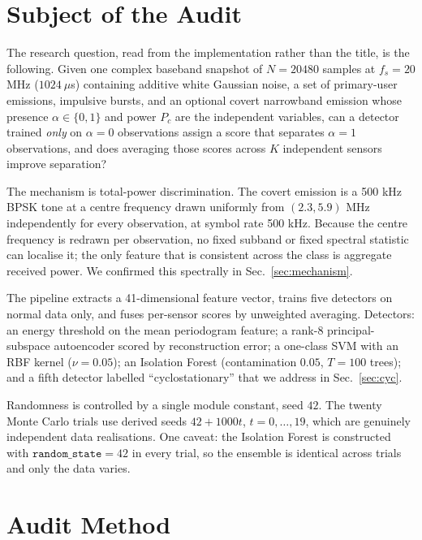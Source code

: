 \documentclass[conference]{IEEEtran}
\begin{document}
\section{Subject of the Audit}
\label{sec:subject}

The research question, read from the implementation rather than the title, is the following. Given one complex baseband snapshot of $N=20480$ samples at $f_s=20$ MHz ($1024~\mu$s) containing additive white Gaussian noise, a set of primary-user emissions, impulsive bursts, and an optional covert narrowband emission whose presence $\alpha\in\{0,1\}$ and power $P_c$ are the independent variables, can a detector trained \emph{only} on $\alpha=0$ observations assign a score that separates $\alpha=1$ observations, and does averaging those scores across $K$ independent sensors improve separation?

The mechanism is total-power discrimination. The covert emission is a 500 kHz BPSK tone at a centre frequency drawn uniformly from $(2.3,5.9)$ MHz independently for every observation, at symbol rate 500 kHz. Because the centre frequency is redrawn per observation, no fixed subband or fixed spectral statistic can localise it; the only feature that is consistent across the class is aggregate received power. We confirmed this spectrally in Sec.~\ref{sec:mechanism}.

The pipeline extracts a 41-dimensional feature vector, trains five detectors on normal data only, and fuses per-sensor scores by unweighted averaging. Detectors: an energy threshold on the mean periodogram feature; a rank-8 principal-subspace autoencoder scored by reconstruction error; a one-class SVM with an RBF kernel ($\nu=0.05$); an Isolation Forest (contamination $0.05$, $T=100$ trees); and a fifth detector labelled ``cyclostationary'' that we address in Sec.~\ref{sec:cyc}.

Randomness is controlled by a single module constant, seed $42$. The twenty Monte Carlo trials use derived seeds $42+1000t$, $t=0,\dots,19$, which are genuinely independent data realisations. One caveat: the Isolation Forest is constructed with $\texttt{random\_state}=42$ in every trial, so the ensemble is identical across trials and only the data varies.

\section{Audit Method}
\label{sec:method}
\end{document}

